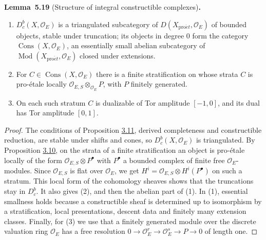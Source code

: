 \documentclass[11pt]{article}
\newenvironment{bpstatement}[2]{\par\addvspace{0.6\baselineskip}\noindent\textbf{#1}#2\textbf{.}\enspace\ignorespaces}
  {\par\addvspace{0.4\baselineskip}}
\newenvironment{bpstatementit}[2]{\begin{bpstatement}{#1}{#2}\itshape\ignorespaces}{\end{bpstatement}}
\providecommand{\Cons}{}\renewcommand{\Cons}{\operatorname{Cons}}
\providecommand{\Dbc}{}\renewcommand{\Dbc}{D^b_c}
\begin{document}
\label{bp471}%
\begin{bpstatementit}{Lemma~5.19}{ (Structure of integral constructible complexes)}
\begin{enumerate}
\item \(\Dbc(X,\mathcal O_E)\) is a triangulated subcategory of \(D(X_{\mathrm{pro}\acute{e}t},\mathcal O_E)\) of bounded objects, stable under truncation; its objects in degree \(0\) form the category \(\Cons(X,\mathcal O_E)\), an essentially small abelian subcategory of \(\operatorname{Mod}(X_{\mathrm{pro}\acute{e}t},\mathcal O_E)\) closed under extensions.
\item For \(C\in\Cons(X,\mathcal O_E)\) there is a finite stratification on whose strata \(C\) is pro-étale locally \(\mathcal O_{E,S}\otimes_{\mathcal O_E}P\), with \(P\) finitely generated.
\item On each such stratum \(C\) is dualizable of Tor amplitude \([-1,0]\), and its dual has Tor amplitude \([0,1]\).
\end{enumerate}
\end{bpstatementit}

\begin{proof}[{Proof}]\label{bp472}%
The conditions of Proposition \hyperref[bp226]{3.11}, derived completeness and constructible reduction, are stable under shifts and cones, so \(\Dbc(X,\mathcal O_E)\) is triangulated. By Proposition \hyperref[bp223]{3.10}, on the strata of a finite stratification an object is pro-étale locally of the form \(\mathcal O_{E,S}\otimes P^\bullet\) with \(P^\bullet\) a bounded complex of finite free \(\mathcal O_E\)-modules. Since \(\mathcal O_{E,S}\) is flat over \(\mathcal O_E\), we get \(H^i=\mathcal O_{E,S}\otimes H^i(P^\bullet)\) on such a stratum. This local form of the cohomology sheaves shows that the truncations stay in \(\Dbc\). It also gives (2), and then the abelian part of (1). In (1), essential smallness holds because a constructible sheaf is determined up to isomorphism by a stratification, local presentations, descent data and finitely many extension classes. Finally, for (3) we use that a finitely generated module over the discrete valuation ring \(\mathcal O_E\) has a free resolution \(0\to\mathcal O_E^r\to\mathcal O_E^s\to P\to0\) of length one.
\end{proof}
\end{document}

